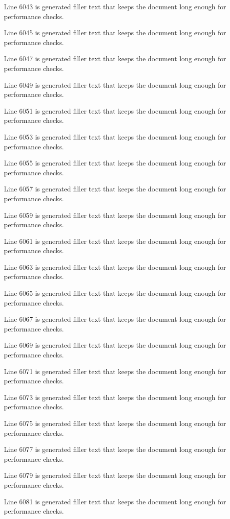 Line 6043 is generated filler text that keeps the document long enough for performance checks.

Line 6045 is generated filler text that keeps the document long enough for performance checks.

Line 6047 is generated filler text that keeps the document long enough for performance checks.

Line 6049 is generated filler text that keeps the document long enough for performance checks.

Line 6051 is generated filler text that keeps the document long enough for performance checks.

Line 6053 is generated filler text that keeps the document long enough for performance checks.

Line 6055 is generated filler text that keeps the document long enough for performance checks.

Line 6057 is generated filler text that keeps the document long enough for performance checks.

Line 6059 is generated filler text that keeps the document long enough for performance checks.

Line 6061 is generated filler text that keeps the document long enough for performance checks.

Line 6063 is generated filler text that keeps the document long enough for performance checks.

Line 6065 is generated filler text that keeps the document long enough for performance checks.

Line 6067 is generated filler text that keeps the document long enough for performance checks.

Line 6069 is generated filler text that keeps the document long enough for performance checks.

Line 6071 is generated filler text that keeps the document long enough for performance checks.

Line 6073 is generated filler text that keeps the document long enough for performance checks.

Line 6075 is generated filler text that keeps the document long enough for performance checks.

Line 6077 is generated filler text that keeps the document long enough for performance checks.

Line 6079 is generated filler text that keeps the document long enough for performance checks.

Line 6081 is generated filler text that keeps the document long enough for performance checks.

